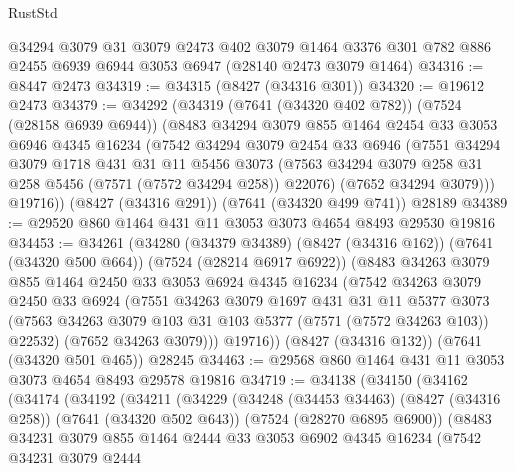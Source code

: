 \begin{lexlean}{RustStd}
\begin{coremodule}
{\begin{coremodule}
{{{{{{{{{{{{{{{{{{{{{{{{{{{{{{{{    @34294
    @3079
    @31
    @3079
    @2473
    @402
    @3079
    @1464
    @3376
    @301
    @782
    @886
    @2455
    @6939
    @6944
    @3053
    @6947
    (@28140 @2473 @3079 @1464)
@34316 := @8447 @2473
@34319 := @34315 (@8427 (@34316 @301))
@34320 := @19612 @2473
@34379 := @34292
    (@34319
      (@7641 (@34320 @402 @782))
      (@7524 (@28158 @6939 @6944))
      (@8483
        @34294
        @3079
        @855
        @1464
        @2454
        @33
        @3053
        @6946
        @4345
        @16234
        (@7542
          @34294
          @3079
          @2454
          @33
          @6946
          (@7551
            @34294
            @3079
            @1718
            @431
            @31
            @11
            @5456
            @3073
            (@7563 @34294 @3079 @258 @31 @258 @5456 (@7571 (@7572 @34294 @258)) @22076)
            (@7652 @34294 @3079)))
        @19716))
    (@8427 (@34316 @291))
    (@7641 (@34320 @499 @741))
    @28189
@34389 := @29520 @860 @1464 @431 @11 @3053 @3073 @4654 @8493 @29530 @19816
@34453 := @34261
    (@34280
      (@34379 @34389)
      (@8427 (@34316 @162))
      (@7641 (@34320 @500 @664))
      (@7524 (@28214 @6917 @6922))
      (@8483
        @34263
        @3079
        @855
        @1464
        @2450
        @33
        @3053
        @6924
        @4345
        @16234
        (@7542
          @34263
          @3079
          @2450
          @33
          @6924
          (@7551
            @34263
            @3079
            @1697
            @431
            @31
            @11
            @5377
            @3073
            (@7563 @34263 @3079 @103 @31 @103 @5377 (@7571 (@7572 @34263 @103)) @22532)
            (@7652 @34263 @3079)))
        @19716))
    (@8427 (@34316 @132))
    (@7641 (@34320 @501 @465))
    @28245
@34463 := @29568 @860 @1464 @431 @11 @3053 @3073 @4654 @8493 @29578 @19816
@34719 := @34138
    (@34150
      (@34162
        (@34174
          (@34192
            (@34211
              (@34229
                (@34248
                  (@34453 @34463)
                  (@8427 (@34316 @258))
                  (@7641 (@34320 @502 @643))
                  (@7524 (@28270 @6895 @6900))
                  (@8483
                    @34231
                    @3079
                    @855
                    @1464
                    @2444
                    @33
                    @3053
                    @6902
                    @4345
                    @16234
                    (@7542
                      @34231
                      @3079
                      @2444
}}}}}}}}}}}}}}}}}}}}}}}}}}}}}}}}
\end{coremodule}}
\end{coremodule}
\end{lexlean}
